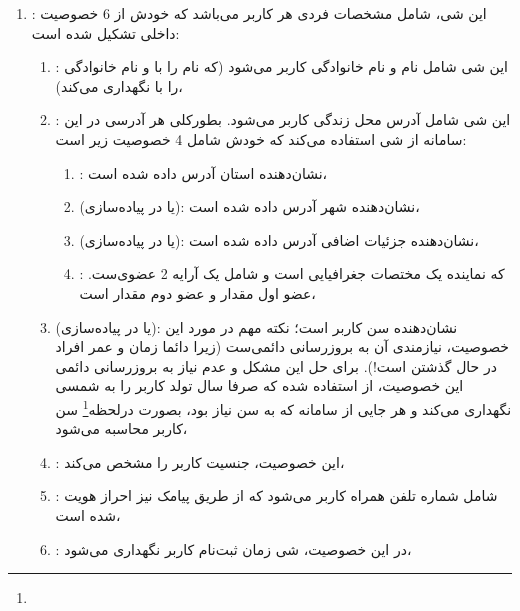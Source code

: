 \begin{enumerate}
	\item {}: این شی، شامل مشخصات فردی هر کاربر می‌باشد که خودش از 6 خصوصیت داخلی تشکیل شده است:
	\begin{enumerate}
		\item {}: این شی شامل نام و نام خانوادگی کاربر می‌شود (که نام را با  و نام خانوادگی را با  نگهداری می‌کند)،
		
		\item {}: این شی شامل آدرس محل زندگی کاربر می‌شود. بطورکلی هر آدرسی در این سامانه از شی  استفاده می‌کند که خودش شامل 4 خصوصیت زیر است:
		\begin{enumerate}[label=\arabic*.]
			\item {}: نشان‌دهنده استان آدرس داده شده است،
			
			\item {}(یا  در پیاده‌سازی): نشان‌دهنده شهر آدرس داده شده است،
			
			\item {}(یا  در پیاده‌سازی): نشان‌دهنده جزئیات اضافی آدرس داده شده است،
			
			\item {}: که نماینده یک مختصات جغرافیایی است و شامل یک آرایه 2 عضوی‌ست. عضو اول مقدار  و عضو دوم مقدار  است،
		\end{enumerate}
		
		\item {}(یا  در پیاده‌سازی): نشان‌دهنده سن کاربر است؛ نکته مهم در مورد این خصوصیت، نیازمندی آن به بروزرسانی دائمی‌ست (زیرا دائما زمان و عمر افراد در حال گذشتن است!). برای حل این مشکل و عدم نیاز به بروزرسانی دائمی این خصوصیت، از  استفاده شده که صرفا سال تولد کاربر را به شمسی نگهداری می‌کند و هر جایی از سامانه که به سن نیاز بود، بصورت درلحظه\footnote{} سن کاربر محاسبه می‌شود،
		
		\item {}: این خصوصیت،‌ جنسیت کاربر را مشخص می‌کند،
		
		\item {}: شامل شماره تلفن همراه کاربر می‌شود که از طریق پیامک نیز احراز هویت شده است،
		
		\item {}: در این خصوصیت، شی زمان ثبت‌نام کاربر نگهداری می‌شود،
	\end{enumerate}


\end{enumerate}
